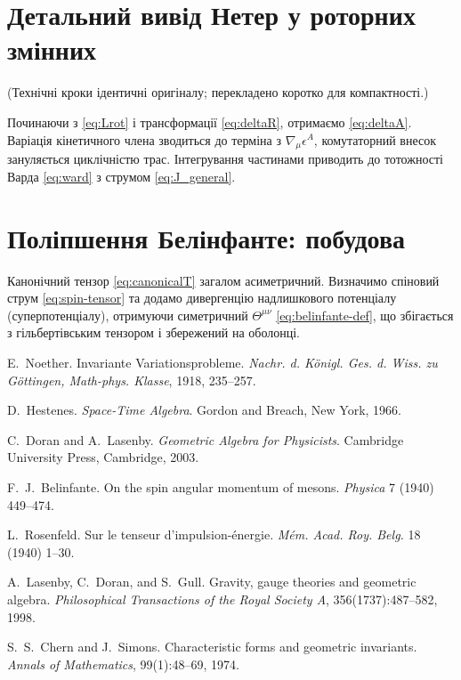 \documentclass[11pt,a4paper]{article}
\numberwithin{equation}{section}
\theoremstyle{plain}
\theoremstyle{definition}
\theoremstyle{remark}
\begin{document}
\appendix

\section{Детальний вивід Нетер у роторних змінних}
\label{app:noether-deriv}

(Технічні кроки ідентичні оригіналу; перекладено коротко для компактності.)

Починаючи з \eqref{eq:Lrot} і трансформації \eqref{eq:deltaR}, отримаємо \eqref{eq:deltaA}. Варіація кінетичного члена зводиться до терміна з $\nabla_\mu\epsilon^A$, комутаторний внесок зануляється циклічністю трас. Інтегрування частинами приводить до тотожності Варда \eqref{eq:ward} з струмом \eqref{eq:J_general}.

\section{Поліпшення Белінфанте: побудова}
\label{app:belinfante}

Канонічний тензор \eqref{eq:canonicalT} загалом асиметричний. Визначимо спіновий струм \eqref{eq:spin-tensor} та додамо дивергенцію надлишкового потенціалу (суперпотенціалу), отримуючи симетричний $\Theta^{\mu\nu}$ \eqref{eq:belinfante-def}, що збігається з гільбертівським тензором і збережений на оболонці.

\begin{thebibliography}{9}

E.~Noether.
\newblock Invariante Variationsprobleme.
\newblock \emph{Nachr. d. Königl. Ges. d. Wiss. zu Göttingen, Math-phys. Klasse}, 1918, 235--257.

D.~Hestenes.
\newblock \emph{Space-Time Algebra}.
\newblock Gordon and Breach, New York, 1966.

C.~Doran and A.~Lasenby.
\newblock \emph{Geometric Algebra for Physicists}.
\newblock Cambridge University Press, Cambridge, 2003.

F.~J.~Belinfante.
\newblock On the spin angular momentum of mesons.
\newblock \emph{Physica} 7 (1940) 449--474.

L.~Rosenfeld.
\newblock Sur le tenseur d'impulsion-énergie.
\newblock \emph{Mém. Acad. Roy. Belg.} 18 (1940) 1--30.

A.~Lasenby, C.~Doran, and S.~Gull.
\newblock Gravity, gauge theories and geometric algebra.
\newblock \emph{Philosophical Transactions of the Royal Society A}, 356(1737):487--582, 1998.

S.~S.~Chern and J.~Simons.
\newblock Characteristic forms and geometric invariants.
\newblock \emph{Annals of Mathematics}, 99(1):48--69, 1974.

\end{thebibliography}
\end{document}

